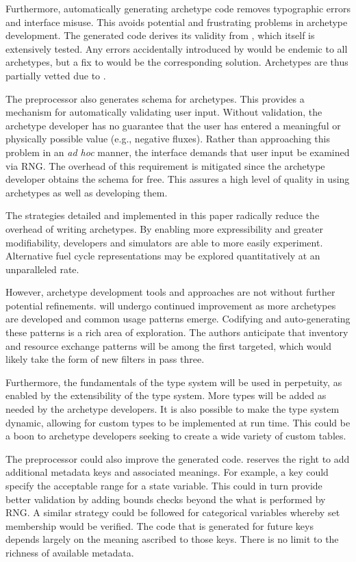 Furthermore, automatically generating archetype code removes typographic errors and 
\cyclus interface misuse. This avoids potential and frustrating problems in 
archetype development. The 
generated code derives its validity from \cycpp, which itself is extensively 
tested. Any errors accidentally introduced by \cycpp would be endemic to all archetypes, 
but a fix to \cycpp would be the corresponding solution. Archetypes are thus 
partially vetted due to \cycpp.

The preprocessor also generates schema for archetypes. This provides a mechanism 
for automatically validating user input.  Without validation, the archetype 
developer has no guarantee that the user has entered a meaningful or physically possible 
value (e.g., negative fluxes). Rather than approaching this problem in an
\emph{ad hoc} 
manner, the \cyclus interface demands that user input be examined via \gls{RNG}.  The overhead 
of this requirement is mitigated since the archetype developer obtains the schema
for free. This assures a high level of quality in using archetypes as well as 
developing them.

The strategies detailed and implemented in this paper radically
reduce the overhead of writing archetypes. By enabling more expressibility and greater
modifiability, developers and simulators are able to more easily experiment.  
Alternative fuel cycle representations may be explored quantitatively at an
unparalleled rate.

However, archetype development tools and approaches are not without further 
potential refinements. \cycpp will undergo continued improvement 
as more archetypes are developed and common usage patterns emerge. Codifying and 
auto-generating these patterns is a rich area of exploration. The authors anticipate 
that inventory and resource exchange patterns will be among the first
targeted, 
which would likely take the form of new filters in pass three.

Furthermore, the fundamentals of the \cyclus type system will be used in 
perpetuity, as enabled by the extensibility of the type system.  More types
will be added as needed by the archetype developers.  It is also possible to 
make the type system dynamic, allowing for custom types to be implemented at run time.
This could be a boon to archetype developers seeking to create a wide variety of custom
tables.

The preprocessor could also improve the generated code. \Cyclus reserves the right
to add additional metadata keys and associated meanings.  For example, a 
key could specify the acceptable range for a state variable. This could in turn 
provide better validation by adding bounds checks beyond the what is performed
by \gls{RNG}. A similar strategy could be followed for categorical variables whereby
set membership would be verified. The code that is generated for future keys 
depends largely on the meaning ascribed to those keys. There is no limit 
to the richness of available metadata.


